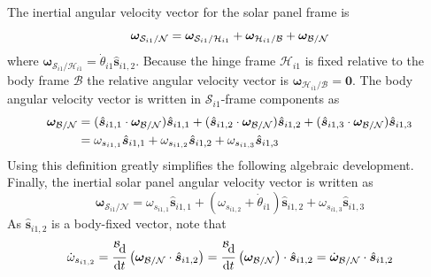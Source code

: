 \documentclass[paper]{aiaaNew}
\begin{document}
	The inertial angular velocity vector for the solar panel frame is
	\begin{equation}
	\bm\omega_{\mathcal{S}_{i1}/\mathcal{N}} = \bm\omega_{\mathcal{S}_{i1}/\mathcal{H}_{i1}} + \bm\omega_{\mathcal{H}_{i1}/\mathcal{B}} + \bm\omega_{\cal B/N}
	\end{equation}
	where $\bm\omega_{\mathcal{S}_{i1}/\mathcal{H}_{i1}} = \dot\theta_{i1} \hat{\bm s}_{i1,2}$.  
	Because the hinge frame $\mathcal{H}_{i1}$ is fixed relative to the body frame $\mathcal{B}$ the relative angular velocity vector is $\bm\omega_{\mathcal{H}_{i1}/\mathcal{B}} = \bm 0$.  The body angular velocity vector is written in $\mathcal{S}_{i1}$-frame components as
	\begin{align}
	\bm\omega_{\cal B/N} &= ( \hat{\bm s}_{i1,1} \cdot \bm\omega_{\cal B/N}) \hat{\bm s}_{i1,1}
	+ (\hat{\bm s}_{i1,2} \cdot\bm\omega_{\cal B/N}) \hat{\bm s}_{i1,2}
	+ (\hat{\bm s}_{i1,3} \cdot\bm\omega_{\cal B/N}) \hat{\bm s}_{i1,3}
	\\
	&= \omega_{s_{i1,1}} \hat{\bm s}_{i1,1} + \omega_{s_{i1,2}} \hat{\bm s}_{i1,2} + \omega_{s_{i1,3}}\hat{\bm s}_{i1,3}
	\end{align}
	Using this definition greatly simplifies the following algebraic development.  Finally, the inertial solar panel angular velocity vector is written as
	\begin{equation}
	\bm\omega_{\mathcal{S}_{i1}/\mathcal{N}}  = \omega_{s_{i1,1}} \hat{\bm s}_{{i1},1} + (\omega_{s_{i1,2}} + \dot\theta_{i1})\hat{\bm s}_{i1,2} + \omega_{s_{i1,3}} \hat{\bm s}_{i1,3}
	\end{equation}
	As $\hat{\bm s}_{i1,2}$ is a body-fixed vector, note that
	\begin{equation}
	\dot\omega_{s_{i1,2}} = \frac{\leftexp{B}\D}{\D t} \left( \bm\omega_{\cal B/N} \cdot \hat{\bm s}_{i1,2} \right)
	= \frac{\leftexp{B}\D}{\D t} \left( \bm\omega_{\cal B/N}\right) \cdot \hat{\bm s}_{i1,2}  = 
	\dot{\bm\omega}_{\cal B/N} \cdot \hat{\bm s}_{i1,2}
	\end{equation}
	
\end{document}
